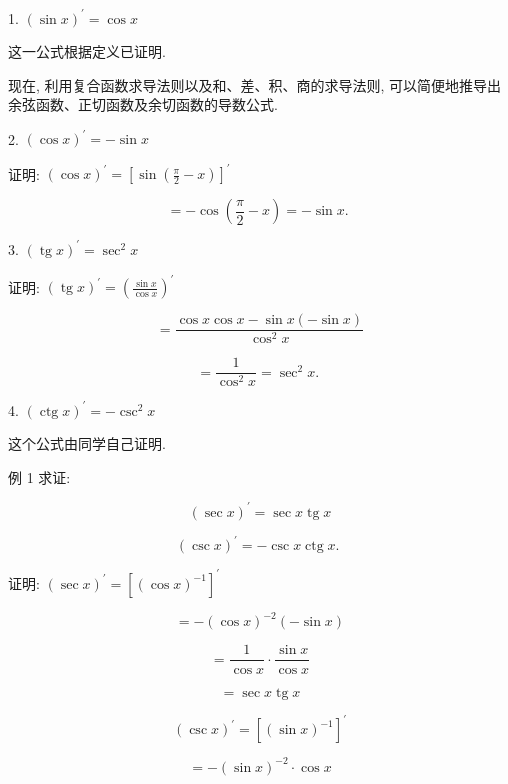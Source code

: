 \documentclass[lang=cn,newtx,12pt,scheme=chinese]{elegantbook}
\begin{document}
\begin{conclusion}
	1. \({\left( \sin x\right) }^{\prime } = \cos x\)
\end{conclusion}
这一公式根据定义已证明.

现在, 利用复合函数求导法则以及和、差、积、商的求导法则, 可以简便地推导出余弦函数、正切函数及余切函数的导数公式.
\begin{conclusion}
	2. \({\left( \cos x\right) }^{\prime } = - \sin x\)
\end{conclusion}

证明: \({\left( \cos x\right) }^{\prime } = {\left\lbrack \sin \left( \frac{\pi }{2} - x\right) \right\rbrack }^{\prime }\)

\[
= - \cos \left( {\frac{\pi }{2} - x}\right) = - \sin x\text{. }
\]

\begin{conclusion}
	3. \({\left( \operatorname{tg}x\right) }^{\prime } = {\sec }^{2}x\)
\end{conclusion}

证明: \({\left( \operatorname{tg}x\right) }^{\prime } = {\left( \frac{\sin x}{\cos x}\right) }^{\prime }\)

\[
= \frac{\cos x\cos x - \sin x\left( {-\sin x}\right) }{{\cos }^{2}x}
\]

\[
= \frac{1}{{\cos }^{2}x} = {\sec }^{2}x\text{. }
\]

\begin{conclusion}
	4. \({\left( \operatorname{ctg}x\right) }^{\prime } = - {\csc }^{2}x\)
\end{conclusion}

这个公式由同学自己证明.

例 1 求证:

\[
{\left( \sec x\right) }^{\prime } = \sec x\operatorname{tg}x
\]

\[
{\left( \csc x\right) }^{\prime } = - \csc x\operatorname{ctg}x\text{. }
\]

证明: \({\left( \sec x\right) }^{\prime } = {\left\lbrack {\left( \cos x\right) }^{-1}\right\rbrack }^{\prime }\)

\[
= - {\left( \cos x\right) }^{-2}\left( {-\sin x}\right)
\]

\[
= \frac{1}{\cos x} \cdot \frac{\sin x}{\cos x}
\]

\[
= \sec x\operatorname{tg}x
\]

\[
{\left( \csc x\right) }^{\prime } = {\left\lbrack {\left( \sin x\right) }^{-1}\right\rbrack }^{\prime }
\]

\[
= - {\left( \sin x\right) }^{-2} \cdot \cos x
\]
\end{document}
